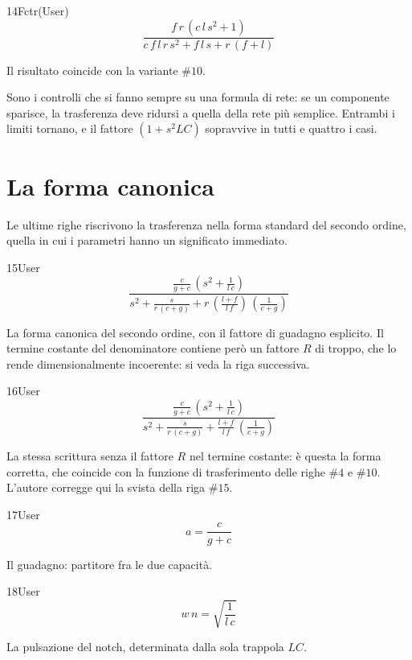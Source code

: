 \begin{espr}{14}{Fctr(User)}{}
\[
\frac{f\, r\, \left(c\, l\, s^{2} + 1\right)}{c\, f\, l\, r\, s^{2} + f\, l\, s + r\, \left(f + l\right)}
\]
\end{espr}
Il risultato coincide con la variante $\#10$.


Sono i controlli che si fanno sempre su una formula di rete: se un componente sparisce, la trasferenza deve ridursi a quella della rete più semplice. Entrambi i limiti tornano, e il fattore $\left(1+s^2LC\right)$ sopravvive in tutti e quattro i casi.

\section{La forma canonica}

Le ultime righe riscrivono la trasferenza nella forma standard del secondo ordine, quella in cui i parametri hanno un significato immediato.

\begin{espr}{15}{User}{}
\[
\frac{\frac{c}{g + c}\, \left(s^{2} + \frac{1}{l\, c}\right)}{s^{2} + \frac{s}{r\, \left(c + g\right)} + r\, \left(\frac{l + f}{l\, f}\right)\, \left(\frac{1}{c + g}\right)}
\]
\end{espr}
La forma canonica del secondo ordine, con il fattore di guadagno esplicito. Il termine costante del denominatore contiene però un fattore $R$ di troppo, che lo rende dimensionalmente incoerente: si veda la riga successiva.

\begin{espr}{16}{User}{}
\[
\frac{\frac{c}{g + c}\, \left(s^{2} + \frac{1}{l\, c}\right)}{s^{2} + \frac{s}{r\, \left(c + g\right)} + \frac{l + f}{l\, f}\, \left(\frac{1}{c + g}\right)}
\]
\end{espr}
La stessa scrittura senza il fattore $R$ nel termine costante: è questa la forma corretta, che coincide con la funzione di trasferimento delle righe $\#4$ e $\#10$. L'autore corregge qui la svista della riga $\#15$.

\begin{espr}{17}{User}{}
\[
a = \frac{c}{g + c}
\]
\end{espr}
Il guadagno: partitore fra le due capacità.

\begin{espr}{18}{User}{}
\[
w\, n = \sqrt{\frac{1}{l\, c}}
\]
\end{espr}
La pulsazione del notch, determinata dalla sola trappola $LC$.

